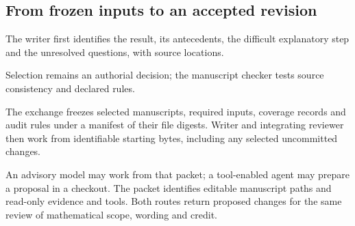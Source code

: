 \documentclass[10pt]{article}
\begin{document}
\subsection{From frozen inputs to an accepted revision}

The writer first identifies the result, its antecedents, the difficult explanatory step and the unresolved questions, with source locations.

Selection remains an authorial decision; the manuscript checker tests source consistency and declared rules.

The exchange freezes selected manuscripts, required inputs, coverage records and audit rules under a manifest of their file digests. Writer and integrating reviewer then work from identifiable starting bytes, including any selected uncommitted changes.

An advisory model may work from that packet; a tool-enabled agent may prepare a proposal in a checkout. The packet identifies editable manuscript paths and read-only evidence and tools. Both routes return proposed changes for the same review of mathematical scope, wording and credit.
\end{document}
